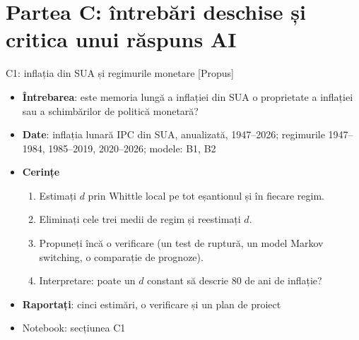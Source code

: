 \section{Partea C: întrebări deschise și critica unui răspuns AI}

\begin{frame}{C1: inflația din SUA și regimurile monetare [Propus]}
\itemsize{\footnotesize}
\begin{itemize}
\item \textbf{Întrebarea}: este memoria lungă a inflației din SUA o proprietate a inflației sau a schimbărilor de politică monetară?
\item \textbf{Date}: inflația lunară IPC din SUA, anualizată, 1947--2026; regimurile 1947--1984, 1985--2019, 2020--2026; modele: B1, B2
\item \textbf{Cerințe}
\begin{enumerate}
    \item Estimați $d$ prin Whittle local pe tot eșantionul și în fiecare regim.
    \item Eliminați cele trei medii de regim și reestimați $d$.
    \item Propuneți încă o verificare (un test de ruptură, un model Markov switching, o comparație de prognoze).
    \item Interpretare: poate un $d$ constant să descrie 80 de ani de inflație?
\end{enumerate}
\item \textbf{Raportați}: cinci estimări, o verificare și un plan de proiect
\item Notebook: secțiunea C1
\end{itemize}
\end{frame}

